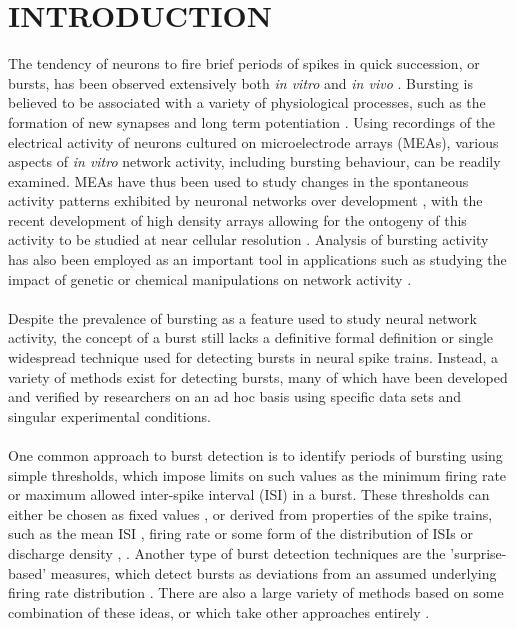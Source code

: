 \documentclass[12pt, titlepage]{article}
\begin{document}
	\section*{INTRODUCTION}
	The tendency of neurons to fire brief periods of spikes in quick succession, or bursts, has been observed extensively both \textit{in vitro} and \textit{in vivo} \cite{Weyand2001,Charlesworth2015,Pasquale2010}. Bursting is believed to be associated with a variety of physiological processes, such as the formation of new synapses \cite{Maeda1995} and long term potentiation \cite{Lisman1997}. Using recordings of the electrical activity of neurons cultured on microelectrode arrays (MEAs), various aspects of \textit{in vitro} network activity, including bursting behaviour, can be readily examined. MEAs have thus been used to study changes in the spontaneous activity patterns exhibited by neuronal networks over development \cite{Wagenaar2006,Charlesworth2015}, with the recent development of high density arrays allowing for the ontogeny of this activity to be studied at near cellular resolution \cite{Maccione2014}. Analysis of bursting activity has also been employed as an important tool in applications such as studying the impact of genetic or chemical manipulations on network activity \cite{Eisenman2015,Charlesworth2016}. 
	\\ \\ Despite the prevalence of bursting as a feature used to study neural network activity, the concept of a burst still lacks a definitive formal definition \cite{Cocatre-Zilgien1992} or single widespread technique used for detecting bursts in neural spike trains. Instead, a variety of methods exist for detecting bursts, many of which have been developed and verified by researchers on an ad hoc basis using specific data sets and singular experimental conditions. 
	\\\\One common approach to burst detection is to identify periods of bursting using simple thresholds, which impose limits on such values as the minimum firing rate or maximum allowed inter-spike interval (ISI) in a burst. These thresholds can either be chosen as fixed values  \cite{Cocatre-Zilgien1992,Chiappalone2005,Mukai2003},  or derived from properties of the spike trains, such as the mean ISI \cite{Chen2009}, firing rate \cite{Pimashkin2011} or some form of the distribution of ISIs or discharge density \cite{Selinger2007,Pasquale2010}, \cite{Kaneoke1996,Bakkum2013,Kapucu2012}. Another type of burst detection techniques are the 'surprise-based' measures, which detect bursts as deviations from an assumed underlying firing rate distribution \cite{Legendy1985,Ko2012,Gourevitch2007}. There are also a large variety of methods based on some combination of these ideas, or which take other approaches entirely \cite{Hennig2011,Tokdar2010,Turnbull2005,Tam2002,Xia2003,Wagenaar2005,Weihberger2013}.
\end{document}
